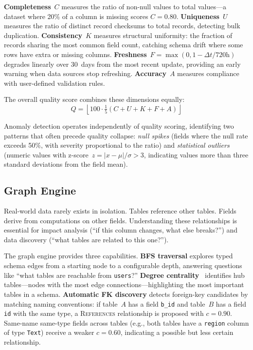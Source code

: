 \documentclass[10pt, twocolumn]{article}
\begin{document}
\textbf{Completeness}~$C$ measures the ratio of non-null values to total values---a dataset where 20\% of a column is missing scores $C = 0.80$. \textbf{Uniqueness}~$U$ measures the ratio of distinct record checksums to total records, detecting bulk duplication. \textbf{Consistency}~$K$ measures structural uniformity: the fraction of records sharing the most common field count, catching schema drift where some rows have extra or missing columns. \textbf{Freshness}~$F = \max(0, 1 - \Delta t / 720\text{h})$ degrades linearly over 30~days from the most recent update, providing an early warning when data sources stop refreshing. \textbf{Accuracy}~$A$ measures compliance with user-defined validation rules.

The overall quality score combines these dimensions equally:
\begin{equation}
Q = \left\lfloor 100 \cdot \tfrac{1}{5}(C + U + K + F + A) \right\rfloor
\label{eq:quality}
\end{equation}

Anomaly detection operates independently of quality scoring, identifying two patterns that often precede quality collapse: \emph{null spikes} (fields where the null rate exceeds 50\%, with severity proportional to the ratio) and \emph{statistical outliers} (numeric values with z-score~$z = |x - \mu|/\sigma > 3$, indicating values more than three standard deviations from the field mean).

\subsection{Graph Engine}\label{sec:graph}

Real-world data rarely exists in isolation. Tables reference other tables. Fields derive from computations on other fields. Understanding these relationships is essential for impact analysis (``if this column changes, what else breaks?'') and data discovery (``what tables are related to this one?'').

The graph engine provides three capabilities. \textbf{BFS traversal} explores typed schema edges from a starting node to a configurable depth, answering questions like ``what tables are reachable from \texttt{users}?'' \textbf{Degree centrality}~\cite{page1999pagerank} identifies hub tables---nodes with the most edge connections---highlighting the most important tables in a schema. \textbf{Automatic FK discovery} detects foreign-key candidates by matching naming conventions: if table~$A$ has a field \texttt{b\_id} and table~$B$ has a field \texttt{id} with the same type, a \textsc{References} relationship is proposed with $c = 0.90$. Same-name same-type fields across tables (e.g., both tables have a \texttt{region} column of type \texttt{Text}) receive a weaker $c = 0.60$, indicating a possible but less certain relationship.
\end{document}
